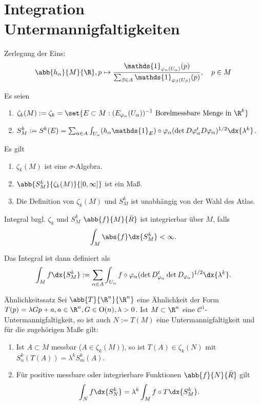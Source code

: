 \section*{Integration Untermannigfaltigkeiten}

\begin{karte}{}
    Zerlegung der Eins: 
    \[ \abb{h_\alpha}{M}{\R}, p \mapsto \frac{\mathds{1}_{\varphi_\alpha(U_\alpha)}(p) }{ \sum_{\beta \in A} \mathds{1}_{ \varphi_\beta (U_\beta) }(p) }, \quad p\in M \]

    Es seien 
    \begin{enumerate}
        \item \( \zeta_k(M) := \zeta_k = \set{ E \subset M: (E_{\varphi_\alpha}(U_\alpha))^{-1} \text{ Borelmessbare Menge in } \R^k } \)
        \item \( S_M^k := S^k(E) = \sum_{\alpha \in A} \int_{U_\alpha} (h_\alpha \mathds{1}_E) 
        \circ \varphi_\alpha(\det D \varphi_\alpha^t D \varphi_\alpha)^{1/2} \dx{\lambda^k} \).
    \end{enumerate}

    Es gilt 
    \begin{enumerate}
        \item \( \zeta_k(M) \) ist eine \(\sigma\)-Algebra.
        \item \( \abb{S_M^k}{\zeta_k(M)}{[0,\infty]} \) ist ein Maß.
        \item Die Definition von \( \zeta_k(M) \) und \( S_M^k \) ist unabhängig von der Wahl des Atlas.
    \end{enumerate}
\end{karte}

\begin{karte}{Integral bzgl. \( \zeta_k \) und \( S_M^k \)}
    \( \abb{f}{M}{\bar{R}} \) ist integrierbar über \(M\), falls 
    \[ \int_M \abs{f} \dx{S_M^k} < \infty. \]

    Das Integral ist dann definiert als 
    \[ \int_M f \dx{S_M^k} := \sum_{\alpha\in A} \int_{U_\alpha} f\circ \varphi_\alpha (\det D^t_{\varphi_\alpha} \det D_{\varphi_\alpha})^{1/2} \dx{\lambda^k}. \]
\end{karte}

\begin{karte}{Ähnlichkeitssatz}
    Sei \( \abb{T}{\R^n}{\R^n} \) eine Ähnlichkeit der Form 
    \( T(p) = \lambda Gp + a, a \in \R^n, G\in \mathrm{O}(n), \lambda > 0 \). Ist \(M \subset \R^n \)
    eine \(\mathcal{C}^1\)-Untermannigfaltigkeit, so ist auch \(N := T(M) \) eine Untermannigfaltigkeit 
    und für die zugehörigen Maße gilt: 
    \begin{enumerate}
        \item Ist \(A \subset M\) messbar (\(A\in \zeta_k(M)\)), so ist \(T(A) \in \zeta_k(N)\) 
        mit \( S_n^k(T(A)) = \lambda^k S_m^k(A) \).
        \item Für positive messbare oder integrierbare Funktionen \( \abb{f}{N}{\bar{R}} \) gilt 
        \[ \int_N f \dx{S_N^k} = \lambda^k \int_M f \circ T \dx{S_M^k}. \]
    \end{enumerate}
\end{karte}

